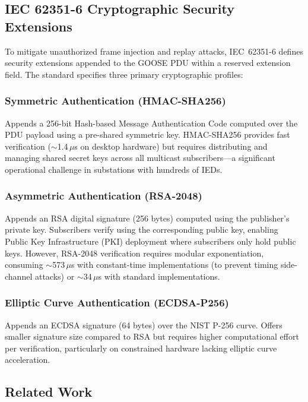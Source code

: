 \documentclass[journal]{IEEEtran}
\begin{document}
\subsection{IEC 62351-6 Cryptographic Security Extensions}
To mitigate unauthorized frame injection and replay attacks, IEC~62351-6 defines security extensions appended to the GOOSE PDU within a reserved extension field. The standard specifies three primary cryptographic profiles:

\subsubsection{Symmetric Authentication (HMAC-SHA256)}
Appends a 256-bit Hash-based Message Authentication Code computed over the PDU payload using a pre-shared symmetric key. HMAC-SHA256 provides fast verification ($\sim$1.4\,$\mu$s on desktop hardware) but requires distributing and managing shared secret keys across all multicast subscribers---a significant operational challenge in substations with hundreds of IEDs.

\subsubsection{Asymmetric Authentication (RSA-2048)}
Appends an RSA digital signature (256 bytes) computed using the publisher's private key. Subscribers verify using the corresponding public key, enabling Public Key Infrastructure (PKI) deployment where subscribers only hold public keys. However, RSA-2048 verification requires modular exponentiation, consuming $\sim$573\,$\mu$s with constant-time implementations (to prevent timing side-channel attacks) or $\sim$34\,$\mu$s with standard implementations.

\subsubsection{Elliptic Curve Authentication (ECDSA-P256)}
Appends an ECDSA signature (64 bytes) over the NIST P-256 curve. Offers smaller signature size compared to RSA but requires higher computational effort per verification, particularly on constrained hardware lacking elliptic curve acceleration.

\subsection{Related Work}
\end{document}
